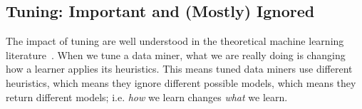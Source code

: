 \documentclass[twocolumn,5p,sort&compress]{elsarticle}
\theoremstyle{break}
\begin{document}





\subsection{Tuning: Important and (Mostly) Ignored}
\label{sect:tune}

The impact of tuning are well understood in the theoretical machine learning literature~\cite{bergstra2012random}.  When we tune a
data miner, what we are really doing is changing how a learner applies its
heuristics. This means tuned data miners use different heuristics, which means
they ignore different possible models, which means they return different models;
i.e. \textit{how} we learn changes \textit{what} we learn.
\end{document}
